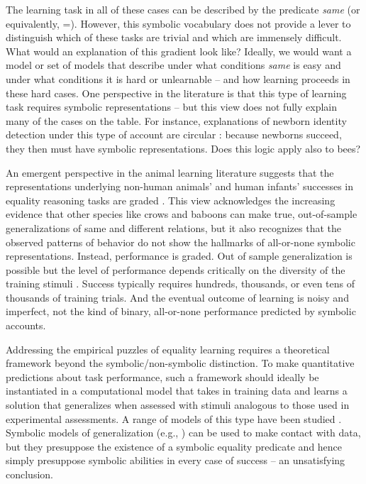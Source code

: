 \documentclass[9pt,twocolumn,twoside,lineno]{pnas-new}
\newcommand{\updateb}[1]{{\color{ourgreen}#1}}
\begin{document}
The learning task in all of these cases can be described by the predicate \emph{same} (or equivalently, =).  However, this symbolic vocabulary does not provide a lever to distinguish which of these tasks are trivial and which are immensely difficult. What would an explanation of this gradient look like? Ideally, we would want a model or set of models that describe under what conditions \emph{same} is easy and under what conditions it is hard or unlearnable -- and how learning proceeds in these hard cases. One perspective in the literature is that this type of learning task requires symbolic representations \cite{marcus:1999,Premack:1983} -- but this view does not fully explain many of the cases on the table. For instance, explanations of newborn identity detection under this type of account are circular \cite{gervain:2012}: because newborns succeed, they then must have symbolic representations. Does this logic apply also to bees?

\updateb{An emergent perspective in the animal learning literature suggests that the representations underlying non-human animals' and human infants' successes in equality reasoning tasks are graded \cite{wasserman:2017,carstensen:underreview}. This view acknowledges the increasing evidence that other species like crows \cite{smirnova:2015} and baboons \cite{fagot} can make true, out-of-sample generalizations of same and different relations, but it also recognizes that the observed patterns of behavior do not show the hallmarks of all-or-none symbolic representations. Instead, performance is graded. Out of sample generalization is possible but the level of performance depends critically on the diversity of the training stimuli \citep[][e.g.]{castro:2010}. Success typically requires hundreds, thousands, or even tens of thousands of training trials. And the eventual outcome of learning is noisy and imperfect, not the kind of binary, all-or-none performance predicted by symbolic accounts.}

Addressing the empirical puzzles of equality learning requires a theoretical framework beyond the symbolic/non-symbolic distinction. To make quantitative predictions about task performance, such a framework should ideally be instantiated in a computational model that takes in training data and learns a solution that generalizes when assessed with stimuli analogous to those used in experimental assessments. A range of models of this type have been studied \cite{alhama:2019}. Symbolic models of generalization (e.g., \citealt{frank:2011}) can be used to make contact with data, but they presuppose the existence of a symbolic equality predicate and hence simply presuppose symbolic abilities in every case of success -- an unsatisfying conclusion.
\end{document}
